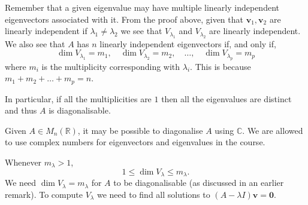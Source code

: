 \begin{remark}
    Remember that a given eigenvalue may have multiple linearly independent eigenvectors associated with it. From the proof above, given that $\bm{v}_1, \bm{v}_2$ are linearly independent if $\lambda_1 \neq \lambda_2$ we see that $V_{\lambda_1}$ and $V_{\lambda_2}$ are linearly independent. We also see that $A$ has $n$ linearly independent eigenvectors if, and only if, \[ \dim{V_{\lambda_1}} = m_1, \quad \dim{V_{\lambda_2}} = m_2, \quad \ldots, \quad \dim{V_{\lambda_p}} = m_p \] where $m_i$ is the multiplicity corresponding with $\lambda_i$. This is because $m_1 + m_2 + \ldots + m_p = n$.
\end{remark}

\begin{corollary}
    In particular, if all the multiplicities are $1$ then all the eigenvalues are distinct and thus $A$ is diagonalisable.
\end{corollary}

\begin{remark}
    Given $A \in M_n(\mathbb{R})$, it may be possible to diagonalise $A$ using $\mathbb{C}$. We are allowed to use complex numbers for eigenvectors and eigenvalues in the course.
\end{remark}

\begin{remark}
    Whenever $m_{\lambda} > 1$, \[ 1 \leq \dim{V_\lambda} \leq m_\lambda. \] We need $\dim V_\lambda = m_\lambda$ for $A$ to be diagonalisable (as discussed in an earlier remark). To compute $V_\lambda$ we need to find all solutions to $(A - \lambda I) \bm{v} = \bm{0}$.
\end{remark}


